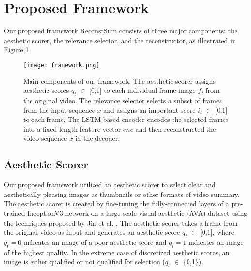 \documentclass[5pt]{article}
\begin{document}
\section{Proposed Framework}
Our proposed framework ReconstSum consists of three major components: the aesthetic scorer, the relevance selector, and the reconstructor, as illustrated in Figure \ref{fig:framework}.

\begin{figure}[h!]
    \centering
    \texttt{[image: framework.png]}
    \setlength{\belowcaptionskip}{-12pt}
    \caption{Main components of our framework. The aesthetic scorer assigns aesthetic scores $q_t$ $\in$ [0,1] to each individual frame image $f_{t}$ from the original video. The relevance selector selects a subset of frames from the input sequence $x$ and assigns an important score $i_t$ $\in$ [0,1] to each frame. The LSTM-based encoder encodes the selected frames into a fixed length feature vector $enc$ and then reconstructed the video sequence $\bar{x}$ in the decoder.}
    \label{fig:framework}
\end{figure}


\subsection{Aesthetic Scorer}
Our proposed framework utilized an aesthetic scorer to select clear and aesthetically pleasing images as thumbnails or other formats of video summary. The aesthetic scorer is created by fine-tuning the fully-connected layers of a pre-trained InceptionV3 network \cite{szegedy2016rethinking} on a large-scale visual aesthetic (AVA) dataset \cite{murray2012ava} using the techniques proposed by Jin et al. \cite{jin2016deep}. The aesthetic scorer takes a frame from the original video as input and generates an aesthetic score $q_t$ $\in$ [0,1], where $q_t = 0$ indicates an image of a poor aesthetic score and $q_t = 1$ indicates an image of the highest quality. In the extreme case of discretized aesthetic scores, an image is either qualified or not qualified for selection ($q_t$ $\in$ \{0,1\}).
\end{document}
